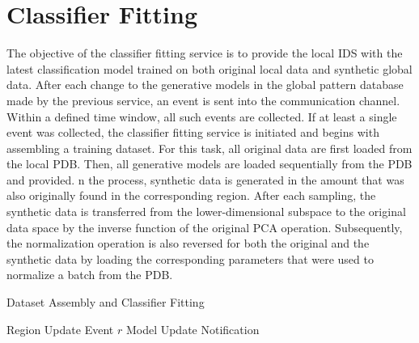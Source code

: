 \section{Classifier Fitting} \label{sec:classifier_fitting}

The objective of the classifier fitting service is to provide the local IDS with the latest classification model trained on both original local data and synthetic global data. After each change to the generative models in the global pattern database made by the previous service, an event is sent into the communication channel. Within a defined time window, all such events are collected. If at least a single event was collected, the classifier fitting service is initiated and begins with assembling a training dataset. For this task, all original data are first loaded from the local PDB. Then, all generative models are loaded sequentially from the PDB and provided. n the process, synthetic data is generated in the amount that was also originally found in the corresponding region. After each sampling, the synthetic data is transferred from the lower-dimensional subspace to the original data space by the inverse function of the original PCA operation. Subsequently, the normalization operation is also reversed for both the original and the synthetic data by loading the corresponding parameters that were used to normalize a batch from the PDB. 

\begin{algorithm}
    \caption{Dataset Assembly and Classifier Fitting}
    \label{alg:classifier_fitting}
 
    \begin{algorithmic}[1]
        \REQUIRE Region Update Event $r$
        \ENSURE Model Update Notification

        


    \end{algorithmic}
 \end{algorithm}






